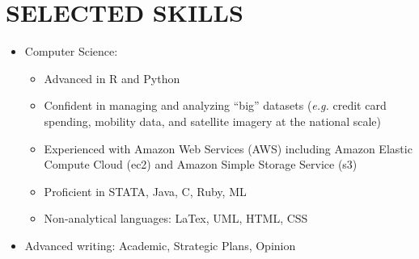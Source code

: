 \documentclass[11pt]{article}
\begin{document}
\section*{SELECTED SKILLS}
\begin{itemize}[left=0pt]
    \item Computer Science:
    \begin{itemize}
        \item Advanced in R and Python
        \item Confident in managing and analyzing ``big'' datasets (\textit{e.g.} credit card spending, mobility data, and satellite imagery at the national scale)
        \item Experienced with Amazon Web Services (AWS) including Amazon Elastic Compute Cloud (ec2) and Amazon Simple Storage Service (s3)
        \item Proficient in STATA, Java, C, Ruby, ML
        \item Non-analytical languages: LaTex, UML, HTML, CSS
    \end{itemize}
    \item Advanced writing: Academic, Strategic Plans, Opinion
\end{itemize}
\end{document}
